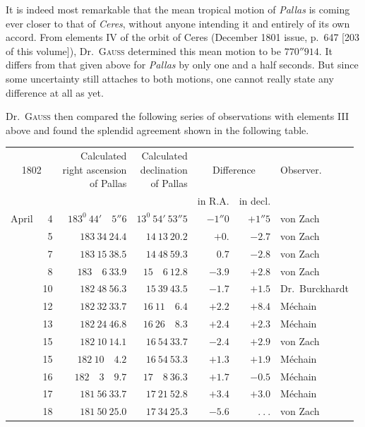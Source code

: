 It is indeed most remarkable that the mean tropical motion of \textit{Pallas} is coming ever closer to that of \textit{Ceres}, without anyone intending it and entirely of its own accord. From elements IV of the orbit of Ceres (December 1801 issue, p.\ 647 [203 of this volume]), Dr.\ \textsc{Gauss} determined this mean motion to be $770''914$. It differs from that given above for \textit{Pallas} by only one and a half seconds. But since some uncertainty still attaches to both motions, one cannot really state any difference at all as yet.

Dr.\ \textsc{Gauss} then compared the following series of observations with elements III above and found the splendid agreement shown in the following table.
\begin{center}
{\small\setlength{\tabcolsep}{4pt}
\begin{tabular}{r r|r|r|r|r|l}
\multicolumn{2}{c|}{1802}&\shortstack{Calculated\\right ascension\\of Pallas}&\shortstack{Calculated\\declination\\of Pallas}&\multicolumn{2}{c|}{Difference}&Observer.\\
\multicolumn{2}{c|}{}&&&in R.A.&in decl.&\\\hline
April&4&$183^0\ 44'\quad5''6$&$13^0\ 54'\ 53''5$&$-1''0$&$+1''5$&von Zach\\
&5&$183\ 34\ 24.4$&$14\ 13\ 20.2$&$+0.$&$-2.7$&von Zach\\
&7&$183\ 15\ 38.5$&$14\ 48\ 59.3$&$0.7$&$-2.8$&von Zach\\
&8&$183\quad6\ 33.9$&$15\quad6\ 12.8$&$-3.9$&$+2.8$&von Zach\\
&10&$182\ 48\ 56.3$&$15\ 39\ 43.5$&$-1.7$&$+1.5$&Dr.\ Burckhardt\\
&12&$182\ 32\ 33.7$&$16\ 11\quad6.4$&$+2.2$&$+8.4$&Méchain\\
&13&$182\ 24\ 46.8$&$16\ 26\quad8.3$&$+2.4$&$+2.3$&Méchain\\
&15&$182\ 10\ 14.1$&$16\ 54\ 33.7$&$-2.4$&$+2.9$&von Zach\\
&15&$182\ 10\quad4.2$&$16\ 54\ 53.3$&$+1.3$&$+1.9$&Méchain\\
&16&$182\quad3\quad9.7$&$17\quad8\ 36.3$&$+1.7$&$-0.5$&Méchain\\
&17&$181\ 56\ 33.7$&$17\ 21\ 52.8$&$+3.4$&$+3.0$&Méchain\\
&18&$181\ 50\ 25.0$&$17\ 34\ 25.3$&$-5.6$&$\ .\ .\ .$&von Zach\\

\end{tabular}}
\end{center}
